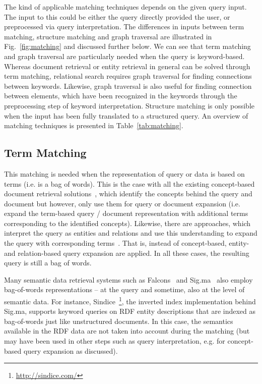 The kind of applicable matching techniques depends on the given query input. The input to this could be either the query directly provided the user, or preprocessed via query interpretation. 
The differences in inputs between term matching, structure matching and graph traversal are illustrated in Fig.~\ref{fig:matching} and discussed further below. We can see that term matching and graph traversal are particularly needed when the query is keyword-based. Whereas document retrieval or entity retrieval in general can be solved through term matching, relational search requires graph traversal for finding connections between keywords. Likewise, graph traversal is also useful for finding connection between elements, which have been recognized in the keywords through the preprocessing step of keyword interpretation. Structure matching is only possible when the input has been fully translated to a structured query. An overview of matching techniques is presented in Table~\ref{tab:matching}. 

\subsection{Term Matching} 
This matching is needed when the representation of query or data is based on terms (i.e. is a bag of words). This is the case with all the existing concept-based document retrieval solutions~\cite{DBLP:conf/sigir/Giger88,DBLP:conf/sigir/ZhongH06,DBLP:conf/sigir/QiuF93,DBLP:conf/sigir/Voorhees93,DBLP:conf/sigir/Voorhees94,DBLP:journals/ipm/MeijTRK10}, which identify the concepts behind the query and document but however, only use them for query or document expansion (i.e. expand the term-based query / document representation with additional terms corresponding to the identified concepts). Likewise, there are approaches, which interpret the query as entities and relations and use this understanding to expand the query with corresponding terms~\cite{DBLP:series/sci/NgoC10}. That is, instead of concept-based, entity- and relation-based query expansion are applied. In all these cases, the resulting query is still a bag of words. 

Many semantic data retrieval systems such as Falcons~\cite{DBLP:journals/ijswis/ChengQ09} and Sig.ma~\cite{DBLP:journals/ws/TummarelloCCDDD10} also employ bag-of-words representations -- at the query and sometime, also at the level of semantic data. For instance, Sindice~\footnote{\url{http://sindice.com/}}, the inverted index implementation behind Sig.ma, supports keyword queries on RDF entity descriptions that are indexed as bag-of-words just like unstructured documents. In this case, the semantics available in the RDF data are not taken into account during the matching (but may have been used in other steps such as query interpretation, e.g. for concept-based query expansion as discussed). 

